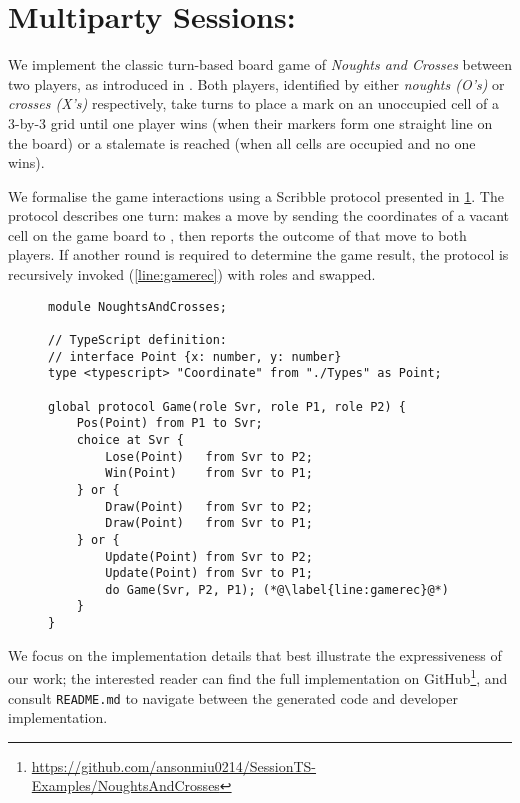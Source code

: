 \section{Multiparty Sessions: }
\label{section:evalgame}

We implement the classic turn-based board game of 
\textit{Noughts and Crosses}
between two players,
as introduced in \cite{PLACES2020}.
Both players, identified by either \textit{noughts (O's)}
or \textit{crosses (X's)} respectively, take turns
to place a mark on an unoccupied cell of a 3-by-3 grid
until one player wins (when their markers form one straight
line on the board) or a stalemate is reached (when all cells
are occupied and no one wins).

We formalise the game interactions using a Scribble protocol
presented in \cref{lst:game}.
The  protocol describes one turn:
 makes a move by sending the coordinates of a
vacant cell on the game board to ,
then  reports the outcome of that move
to both players. If another round is required
to determine the game result, the 
protocol is recursively invoked (\cref{line:gamerec}) with
roles  and  swapped.

\begin{figure}[!ht]
\begin{lstlisting}[language=Scribble]
module NoughtsAndCrosses;

// TypeScript definition:
// interface Point {x: number, y: number}
type <typescript> "Coordinate" from "./Types" as Point;

global protocol Game(role Svr, role P1, role P2) {
	Pos(Point) from P1 to Svr;
	choice at Svr {
		Lose(Point)   from Svr to P2;
		Win(Point)    from Svr to P1;
	} or {
		Draw(Point)   from Svr to P2;
		Draw(Point)   from Svr to P1;
	} or {
		Update(Point) from Svr to P2;
		Update(Point) from Svr to P1;
		do Game(Svr, P2, P1); (*@\label{line:gamerec}@*)
	}
}
\end{lstlisting}
\label{lst:game}
\end{figure}

We focus on the implementation details that
best illustrate the expressiveness of our work;
the interested reader can find the full implementation on
GitHub\footnote{
\url{https://github.com/ansonmiu0214/SessionTS-Examples/NoughtsAndCrosses}
}, and consult \texttt{README.md} to navigate between the generated code
and developer implementation.

